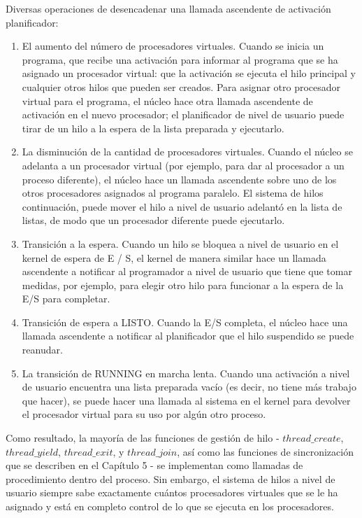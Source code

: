 \documentclass[10pt]{book}
\begin{document}
Diversas operaciones de desencadenar una llamada ascendente de activación planificador:
\begin{enumerate}
\item El aumento del número de procesadores virtuales. Cuando se inicia un programa, que recibe una activación para informar al programa que se ha asignado un procesador virtual: que la activación se ejecuta el hilo principal y cualquier otros hilos que pueden ser creados. Para asignar otro procesador virtual para el programa, el núcleo hace otra llamada ascendente de activación en el nuevo procesador; el planificador de nivel de usuario puede tirar de un hilo a la espera de la lista preparada y ejecutarlo.

\item La disminución de la cantidad de procesadores virtuales. Cuando el núcleo se adelanta a un procesador virtual (por ejemplo, para dar al procesador a un proceso diferente), el núcleo hace un llamada ascendente sobre uno de los otros procesadores asignados al programa paralelo. El sistema de hilos continuación, puede mover el hilo a nivel de usuario adelantó en la lista de listas, de modo que un procesador diferente puede ejecutarlo.

\item Transición a la espera. Cuando un hilo se bloquea a nivel de usuario en el kernel de espera de E / S, el kernel de manera similar hace un llamada ascendente a notificar al programador a nivel de usuario que tiene que tomar medidas, por ejemplo, para elegir otro hilo para funcionar a la espera de la E/S para completar.

\item Transición de espera a LISTO. Cuando la E/S completa, el núcleo hace una llamada ascendente a notificar al planificador que el hilo suspendido se puede reanudar.

\item La transición de RUNNING en marcha lenta. Cuando una activación a nivel de usuario encuentra una lista preparada vacío (es decir, no tiene más trabajo que hacer), se puede hacer una llamada al sistema en el kernel para devolver el procesador virtual para su uso por algún otro proceso.
\end{enumerate}

Como resultado, la mayoría de las funciones de gestión de hilo - $thread\_create$, $thread\_ yield$, $thread\_ exit$, y $thread\_ join$, así como las funciones de sincronización que se describen en el Capítulo 5 - se implementan como llamadas de procedimiento dentro del proceso. Sin embargo, el sistema de hilos a nivel de usuario siempre sabe exactamente cuántos procesadores virtuales que se le ha asignado y está en completo control de lo que se ejecuta en los procesadores.
\end{document}
